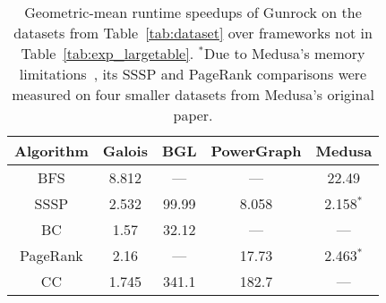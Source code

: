 \documentclass[format=acmsmall,review=false,screen=true]{acmart}
\begin{document}
\begin{table}
\small
    \centering
        \begin{tabular}{*{5}{c}} \toprule Algorithm & Galois &BGL&PowerGraph&Medusa \\
        \midrule
        BFS & 8.812 & --- & --- & 22.49
        \\ SSSP & 2.532 & 99.99 & 8.058 & 2.158$^*$
        \\ BC & 1.57 & 32.12 & --- & ---
        \\ PageRank & 2.16 & --- & 17.73 & 2.463$^*$
        \\ CC & 1.745 & 341.1 & 182.7 & ---
        \\ \bottomrule
    \end{tabular}
    \caption[Geomean speedups of Gunrock over frameworks not in
     Table~\ref{tab:exp_largetable}.]{Geometric-mean runtime speedups
      of Gunrock on the datasets from Table~\ref{tab:dataset} over
      frameworks not in Table~\ref{tab:exp_largetable}. $^*$Due to
      Medusa's memory limitations~\cite{Zhong:2014:MSG}, its SSSP and
      PageRank comparisons were measured on four smaller datasets from
      Medusa's original paper.\label{tab:speedup}}
\end{table}
\end{document}
